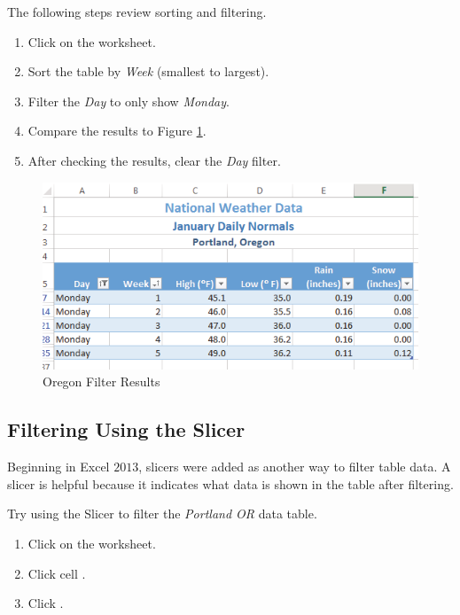 The following steps review sorting and filtering.

\begin{enumbox}
	\begin{enumerate}
		\item Click on the  worksheet.
		\item Sort the table by \textit{Week} (smallest to largest).
		\item Filter the \textit{Day} to only show \textit{Monday}.
		\item Compare the results to Figure \ref{05:fig19}.
		\item After checking the results, clear the \textit{Day} filter.
	\end{enumerate}
\end{enumbox}
	
\begin{figure}[H]
	\centering
	\includegraphics[width=\maxwidth{.95\linewidth}]{gfx/ch05_fig19}
	\caption{Oregon Filter Results}
	\label{05:fig19}
\end{figure}

\subsection{Filtering Using the Slicer}

Beginning in Excel $ 2013 $, slicers were added as another way to filter table data. A slicer is helpful because it indicates what data is shown in the table after filtering.

Try using the Slicer to filter the \textit{Portland OR} data table.

\begin{enumbox}
	\begin{enumerate}
		\item Click on the  worksheet. 
		\item Click cell .
		\item Click .
	\end{enumerate}
\end{enumbox}
		
